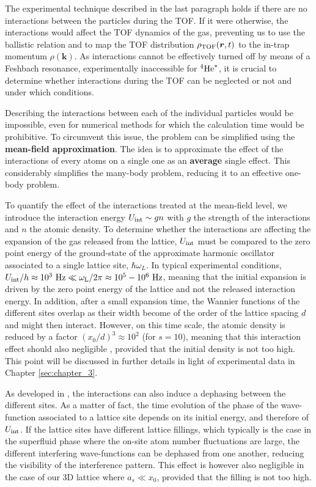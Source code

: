 The experimental technique described in the last paragraph holds if there are no interactions between the particles during the TOF. If it were otherwise, the interactions would affect the TOF dynamics of the gas, preventing us to use the ballistic relation and to map the TOF distribution $\rho_{\rm{TOF}}(\bm{r},t)$ to the in-trap momentum $\rho(\bm{k})$. As interactions cannot be effectively turned off by means of a Feshbach resonance, experimentally inaccessible for $^4 \mathrm{He}^*$, it is crucial to determine whether interactions during the TOF can be neglected or not and under which conditions.

Describing the interactions between each of the individual particles would be impossible, even for numerical methods for which the calculation time would be prohibitive. To circumvent this issue, the problem can be simplified using the \textbf{mean-field approximation}. The idea is to approximate the effect of the interactions of every atoms on a single one as an \textbf{average} single effect. This considerably simplifies the many-body problem, reducing it to an effective one-body problem.

To quantify the effect of the interactions treated at the mean-field level, we introduce the interaction energy $U_{\rm{int}} \sim gn$ with $g$ the strength of the interactions and $n$ the atomic density. To determine whether the interactions are affecting the expansion of the gas released from the lattice, $U_{\rm{int}}$ must be compared to the zero point energy of the ground-state of the approximate harmonic oscillator associated to a single lattice site, $\hbar \omega_L$. In typical experimental conditions, $U_{\rm{int}}/h \approx 10^3 \ \rm{Hz} \ll \omega_L/2 \pi \approx 10^5-10^6 \ \rm{Hz}$, meaning that the initial expansion is driven by the zero point energy of the lattice and not the released interaction energy. In addition, after a small expansion time, the Wannier functions of the different sites overlap as their width become of the order of the lattice spacing $d$ and might then interact. However, on this time scale, the atomic density is reduced by a factor $(x_0/d)^3 \approx 10^2$ (for $s=10$), meaning that this interaction effect should also negligible \cite{gerbier2008expansion}, provided that the initial density is not too high. This point will be discussed in further details in light of experimental data in Chapter \ref{sec:chapter_3}.

As developed in \cite{kupferschmidt2010role}, the interactions can also induce a dephasing between the different sites. As a matter of fact, the time evolution of the phase of the wave-function associated to a lattice site depends on its initial energy, and therefore of $U_{\rm{int}}$. If the lattice sites have different lattice fillings, which typically is the case in the superfluid phase where the on-site atom number fluctuations are large, the different interfering wave-functions can be dephased from one another, reducing the visibility of the interference pattern. This effect is however also negligible \cite{gerbier2008expansion,kupferschmidt2010role} in the case of our 3D lattice where $a_s \ll x_0$, provided that the filling is not too high.

